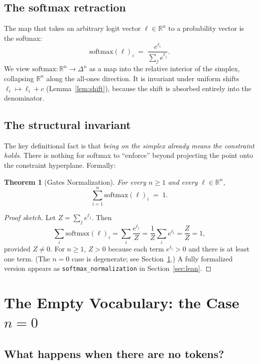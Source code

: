 \documentclass[11pt]{article}
\newtheorem{theorem}{Theorem}[section]
\newcommand{\simplex}[1]{\Delta^{#1}}
\newcommand{\RR}{\mathbb{R}}
\newcommand{\softmax}{\mathrm{softmax}}
\begin{document}
\subsection{The softmax retraction}
\label{sec:softmax-retract}

The map that takes an arbitrary logit vector $\ell\in\RR^n$ to a probability
vector is the softmax:
\[
\softmax(\ell)_i \;=\; \frac{e^{\ell_i}}{\sum_j e^{\ell_j}}.
\]
We view $\softmax : \RR^n \to \simplex{n}$ as a map into the relative interior
of the simplex, collapsing $\RR^n$ along the all-ones direction. It is invariant
under uniform shifts $\ell_i \mapsto \ell_i + c$ (Lemma~\ref{lem:shift}), because
the shift is absorbed entirely into the denominator.

\subsection{The structural invariant}
\label{sec:structural}

The key definitional fact is that \emph{being on the simplex already means the
constraint holds}. There is nothing for softmax to ``enforce'' beyond projecting
the point onto the constraint hyperplane. Formally:

\begin{theorem}[Gates Normalization]
\label{thm:gates}
For every $n\ge 1$ and every $\ell\in\RR^n$,
\[
\sum_{i=1}^{n} \softmax(\ell)_i \;=\; 1.
\]
\end{theorem}

\begin{proof}[Proof sketch]
Let $Z = \sum_j e^{\ell_j}$. Then
\[
\sum_i \softmax(\ell)_i
= \sum_i \frac{e^{\ell_i}}{Z}
= \frac{1}{Z}\sum_i e^{\ell_i}
= \frac{Z}{Z} = 1,
\]
provided $Z\neq 0$. For $n\ge 1$, $Z>0$ because each term $e^{\ell_i}>0$ and
there is at least one term. (The $n=0$ case is degenerate; see
Section~\ref{sec:empty}.) A fully formalized version appears as
\texttt{softmax\_normalization} in Section~\ref{sec:lean}.
\end{proof}

\section{The Empty Vocabulary: the Case $n=0$}
\label{sec:empty}

\subsection{What happens when there are no tokens?}
\label{sec:empty-what}
\end{document}
